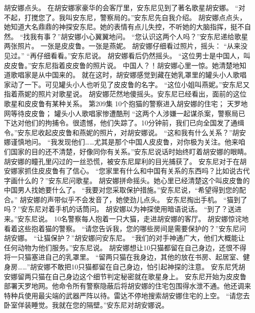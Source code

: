 \documentclass[a4paper,12pt,UTF8,twoside]{ctexbook}
\begin{document}
        胡安娜点头。 
        在胡安娜家豪华的会客厅里，安东尼见到了著名歌星胡安娜。 
        “对不起，打搅您了。我叫安东尼，警察局的。”安东尼先自我介绍。 
        胡安娜点点头，她知道大名鼎鼎的神探安东尼。她的表情有点儿失控，不听她的大脑指挥，挺不自然。 
        “找我有事？”胡安娜小心翼翼地问。 
        “您认识这两个人吗？”安东尼递给歌星两张照片。 
        一张是皮皮鲁。一张是燕妮。 
        胡安娜仔细看过照片，摇头： 
        “从来没见过。” 
        “再仔细看看。”安东尼说。 
        胡安娜看后仍然摇头。 
        “这位男士是中国人，叫皮皮鲁。”安东尼指着皮皮鲁的照片说。 
        中国人？！胡安娜心里一惊。她清楚地知道歌唱家是从中国来的。 
        就在这时，胡安娜感觉到藏在她乳罩里的罐头小人歌唱家动了一下。可见罐头小人也听见了皮皮鲁的名字。 
        “这位小姐叫燕妮。”安东尼又指着燕妮的照片对歌星说。 
        胡安娜茫然地傻摇头。安东尼已经看出，面前的这位歌星和皮皮鲁有某种关系。   第209集 
        10个抱猫的警察进入胡安娜的住宅； 
        天罗地网等待皮皮鲁； 
        罐头小人歌唱家惨遭酷刑   
        “这两个人涉嫌一起谋杀案，警察局已下达对他们的拘捕令。很遗憾，他们失踪了。10分钟前，我们已向全国发了通缉令。”安东尼收起皮皮鲁和燕妮的照片，对胡安娜说。 
        “这和我有什么关系？”胡安娜谨慎地问。 
        “我发现他们……尤其是那个中国人皮皮鲁，对你极为关注。他来咱们国家的目的还不清楚，好像同你有关系。”安东尼说话时始终盯着胡安娜的眼睛。 
        胡安娜的瞳孔里闪过的一丝恐慌，被安东尼犀利的目光捕获了。 
        安东尼对于在胡安娜家抓住皮皮鲁有了信心。 
        “您家里有什么和中国有关系的东西吗？比如说古代字画什么的？”安东尼问歌星。 
        胡安娜拼命摇头。她心里已经清楚这个叫皮皮鲁的中国男人找她要什么了。 
        “我要对您采取保护措施。”安东尼说，“希望得到您的配合。” 
        胡安娜的声带似乎不会发音了，她使劲儿点头。 
        安东尼掏出手机。 
        “猫到了吗？”安东尼对着手机的话筒问。 
        胡安娜以为神探使用暗语说话。 
        “到了？送进来。”安东尼说。 
        10名警察每人抱着一只大猫，走进胡安娜的客厅。 
        胡安娜惊诧地看着这些抱着猫的警察。 
        “请您告诉我，您的哪些房间是需要保护的？”安东尼问胡安娜。 
        “让猫保护？”胡安娜问安东尼。 
        “我们的对手神通广大，他们大概能让任何动物为他们服务。”安东尼说。 
        胡安娜想让10只猫都留在自己身边，还恨不得将一只猫塞进自己的乳罩里。 
        “留两只猫在我身边，其他的放在书房、起居室、健身房……”胡安娜不敢把10只猫都留在自己身边，怕引起神探的注意。 
        安东尼凭胡安娜留两只猫在自己身边这个细节判定秘密就在歌星身上。 
        安东尼开始为皮皮鲁部署天罗地网。他命令所有警察隐蔽后将胡安娜的住宅包围得水泄不通。他还调来特种兵使用最尖端的武器严阵以待。雷达不停地搜索胡安娜住宅的上空。 
        “请您去卧室佯装睡觉。我就在您的隔壁。”安东尼对胡安娜说。 
\end{document}
